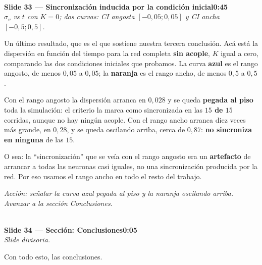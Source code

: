 \documentclass[11pt]{article}
\newcommand{\slide}[3]{%
  \vspace{6pt}%
  \noindent{\color{azulOscuro}\rule{3.2cm}{2pt}}\\[2pt]
  \noindent\textbf{\color{azulOscuro}#1}\hfill\textbf{\color{azulMedio}#3}\\[-2pt]
  {\small\color{grisTexto}\itshape #2}\\[2pt]
}
\begin{document}
\slide{Slide 33 — Sincronización inducida por la condición inicial}{$\sigma_v$ vs $t$ con $K=0$; dos curvas: CI angosta $[-0{,}05;0{,}05]$ y CI ancha $[-0{,}5;0{,}5]$.}{0:45}
\begin{guion}
Un último resultado, que es el que sostiene nuestra tercera conclusión. Acá está la dispersión en función del tiempo para la red completa \textbf{sin acople}, $K$ igual a cero, comparando las dos condiciones iniciales que probamos. La curva \textbf{azul} es el rango angosto, de menos $0{,}05$ a $0{,}05$; la \textbf{naranja} es el rango ancho, de menos $0{,}5$ a $0{,}5$.

Con el rango angosto la dispersión arranca en $0{,}028$ y se queda \textbf{pegada al piso} toda la simulación: el criterio la marca como sincronizada en las \textbf{$15$ de $15$} corridas, aunque no hay ningún acople. Con el rango ancho arranca diez veces más grande, en $0{,}28$, y se queda oscilando arriba, cerca de $0{,}87$: \textbf{no sincroniza en ninguna} de las $15$.

O sea: la ``sincronización'' que se veía con el rango angosto era un \textbf{artefacto} de arrancar a todas las neuronas casi iguales, no una sincronización producida por la red. Por eso usamos el rango ancho en todo el resto del trabajo.
\end{guion}
\textit{Acción: señalar la curva azul pegada al piso y la naranja oscilando arriba. Avanzar a la sección Conclusiones.}

\slide{Slide 34 — Sección: Conclusiones}{Slide divisoria.}{0:05}
\begin{guion}
Con todo esto, las conclusiones.
\end{guion}
\end{document}
